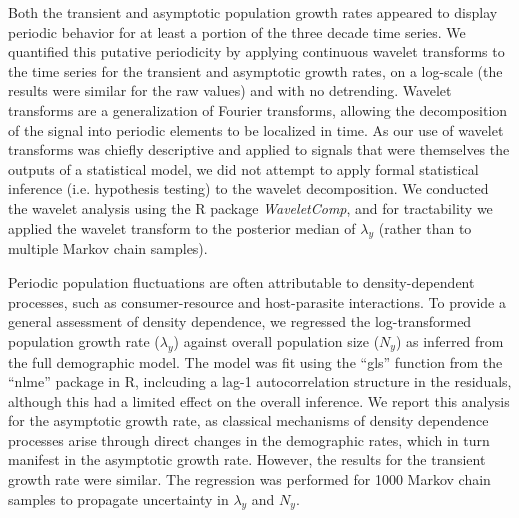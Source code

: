 Both the transient and asymptotic population growth rates appeared to display periodic
behavior for at least a portion of the three decade time series.
We quantified this putative periodicity by applying continuous wavelet transforms to 
the time series for the transient and asymptotic growth rates, 
on a log-scale (the results were similar for the raw values) 
and with no detrending.
Wavelet transforms are a generalization of Fourier transforms,
allowing the decomposition of the signal into periodic elements to be localized in time. 
As our use of wavelet transforms was chiefly descriptive and applied to signals 
that were themselves the outputs of a statistical model,
we did not attempt to apply formal statistical inference (i.e. hypothesis testing)
to the wavelet decomposition.
We conducted the wavelet analysis using the R package \emph{WaveletComp},
and for tractability we applied the wavelet transform 
to the posterior median of $\lambda_y$ (rather than to multiple Markov chain samples).

Periodic population fluctuations are often attributable to density-dependent processes,
such as consumer-resource and host-parasite interactions.
To provide a general assessment of density dependence,
we regressed the log-transformed population growth rate ($\lambda_y$)
against overall population size ($N_y$) as inferred from the full demographic model.
The model was fit using the ``gls'' function from the ``nlme'' package in R,
inclcuding a lag-1 autocorrelation structure in the residuals,
although this had a limited effect on the overall inference.
We report this analysis for the asymptotic growth rate,
as classical mechanisms of density dependence processes 
arise through direct changes in the demographic rates, 
which in turn manifest in the asymptotic growth rate.
However, the results for the transient growth rate were similar. 
The regression was performed for 1000 Markov chain samples
to propagate uncertainty in $\lambda_y$ and $N_y$.

